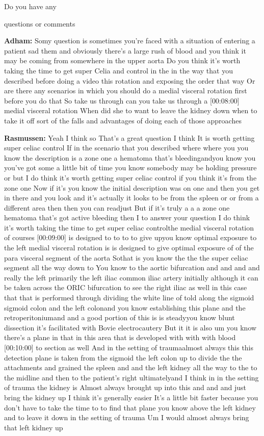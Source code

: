 \documentclass[
]{book}
\begin{document}
Do you have any

questions or comments

\textbf{Adham:} Somy question is sometimes you're faced with a situation of
entering a patient sad them and obviously there's a large rush of blood
and you think it may be coming from somewhere in the upper aorta Do you
think it's worth taking the time to get super Celia and control in the
in the way that you described before doing a video this rotation and
exposing the order that way Or are there any scenarios in which you
should do a medial visceral rotation first before you do that So take us
through can you take us through a {[}00:08:00{]} medial visceral rotation
When did she to want to leave the kidney down when to take it off sort
of the falls and advantages of doing each of those approaches

\textbf{Rasmussen:} Yeah I think so That's a great question I think It is
worth getting super celiac control If in the scenario that you described
where where you you know the description is a zone one a hematoma that's
bleedingandyou know you you've got some a little bit of time you know
somebody may be holding pressure or but I do think it's worth getting
super celiac control if you think it's from the zone one Now if it's you
know the initial description was on one and then you get in there and
you look and it's actually it looks to be from the spleen or or from a
different area then then you can readjust But if it's truly a a a zone
one hematoma that's got active bleeding then I to answer your question I
do think it's worth taking the time to get super celiac controlthe
medial visceral rotation of courses {[}00:09:00{]} is designed to to to to
give upyou know optimal exposure to the left medial visceral rotation is
is designed to give optimal exposure of of the para visceral segment of
the aorta Sothat is you know the the the super celiac segment all the
way down to You know to the aortic bifurcation and and and and really
the left primarily the left iliac common iliac artery initially although
it can be taken across the ORIC bifurcation to see the right iliac as
well in this case that that is performed through dividing the white line
of told along the sigmoid sigmoid colon and the left colonand you know
establishing this plane and the retroperitoniumand and a good portion of
this is is steadyyou know blunt dissection it's facilitated with Bovie
electrocautery But it it is also um you know there's a plane in that in
this area that is developed with with with blood {[}00:10:00{]} to section
as well And in the setting of traumaalmost always this this detection
plane is taken from the sigmoid the left colon up to divide the the
attachments and grained the spleen and and the left kidney all the way
to the to the midline and then to the patient's right ultimatelyand I
think in in the setting of trauma the kidney is Almost always brought up
into this and and and just bring the kidney up I think it's generally
easier It's a little bit faster because you don't have to take the time
to to find that plane you know above the left kidney and to leave it
down in the setting of trauma Um I would almost always bring that left
kidney up
\end{document}
